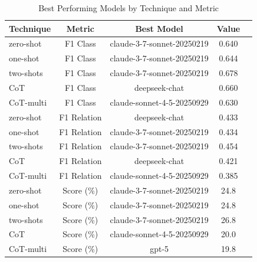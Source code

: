 \begin{table}[htbp]
\centering
\caption{Best Performing Models by Technique and Metric}
\begin{tabular}{lcccc}
\toprule
\textbf{Technique} & \textbf{Metric} & \textbf{Best Model} & \textbf{Value} \\
\midrule
zero-shot & F1 Class & claude-3-7-sonnet-20250219 & 0.640 \\
\midrule
one-shot & F1 Class & claude-3-7-sonnet-20250219 & 0.644 \\
\midrule
two-shots & F1 Class & claude-3-7-sonnet-20250219 & 0.678 \\
\midrule
CoT & F1 Class & deepseek-chat & 0.660 \\
\midrule
CoT-multi & F1 Class & claude-sonnet-4-5-20250929 & 0.630 \\
\midrule
zero-shot & F1 Relation & deepseek-chat & 0.433 \\
\midrule
one-shot & F1 Relation & claude-3-7-sonnet-20250219 & 0.434 \\
\midrule
two-shots & F1 Relation & claude-3-7-sonnet-20250219 & 0.454 \\
\midrule
CoT & F1 Relation & deepseek-chat & 0.421 \\
\midrule
CoT-multi & F1 Relation & claude-sonnet-4-5-20250929 & 0.385 \\
\midrule
zero-shot & Score (\%) & claude-3-7-sonnet-20250219 & 24.8 \\
\midrule
one-shot & Score (\%) & claude-3-7-sonnet-20250219 & 24.8 \\
\midrule
two-shots & Score (\%) & claude-3-7-sonnet-20250219 & 26.8 \\
\midrule
CoT & Score (\%) & claude-sonnet-4-5-20250929 & 20.0 \\
\midrule
CoT-multi & Score (\%) & gpt-5 & 19.8 \\
\bottomrule
\end{tabular}
\label{tab:best_models}
\end{table}